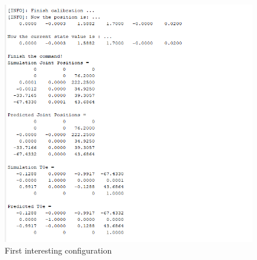 \documentclass[12pt]{article}
\begin{document}
\begin{enumerate}
{}  \\
\begin{figure} [h]
	\centering 
\includegraphics[scale=.5]{firstweird config}
\caption{First interesting configuration}
\end{figure}


\end{enumerate}
\end{document}
